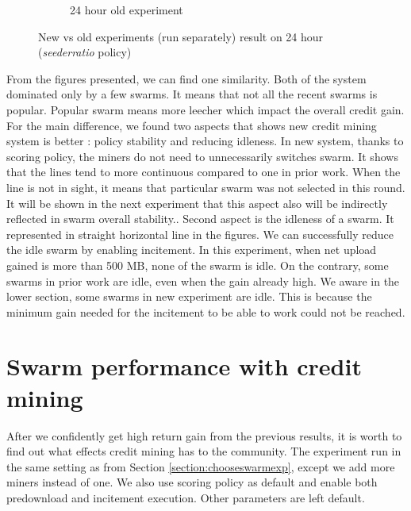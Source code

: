 \begin{figure}[h]
\begin{adjustwidth}{-2cm}{}
\begin{subfigure}[t]{0.6\textwidth}
			\caption{24 hour old experiment}
			\label{fig:oldetree24}
		\end{subfigure}
		\caption{New vs old experiments (run separately) result on 24 hour (\textit{seederratio} policy)}
	\end{adjustwidth}
\end{figure}

From the figures presented, we can find one similarity. Both of the system dominated only by a few swarms. It means that not all the recent swarms is popular. Popular swarm means more leecher which impact the overall credit gain.  For the main difference, we found two aspects that shows new credit mining system is better : policy stability and reducing idleness. In new system, thanks to scoring policy, the miners do not need to unnecessarily switches swarm. It shows that the lines tend to more continuous compared to one in prior work. When the line is not in sight, it means that particular swarm was not selected in this round. It will be shown in the next experiment that this aspect also will be indirectly reflected in swarm overall stability.. Second aspect is the idleness of a swarm. It represented in straight horizontal line in the figures. We can successfully reduce the idle swarm by enabling incitement. In this experiment, when net upload gained is more than 500 MB, none of the swarm is idle. On the contrary, some swarms in prior work are idle, even when the gain already high. We aware in the lower section, some swarms in new experiment are idle. This is because the minimum gain needed for the incitement to be able to work could not be reached.

\section{Swarm performance with credit mining}

After we confidently get high return gain from the previous results, it is worth to find out what effects credit mining has to the community. The experiment run in the same setting as from Section \ref{section:chooseswarmexp}, except we add more miners instead of one. We also use scoring policy as default and enable both predownload and incitement execution. Other parameters are left default.

